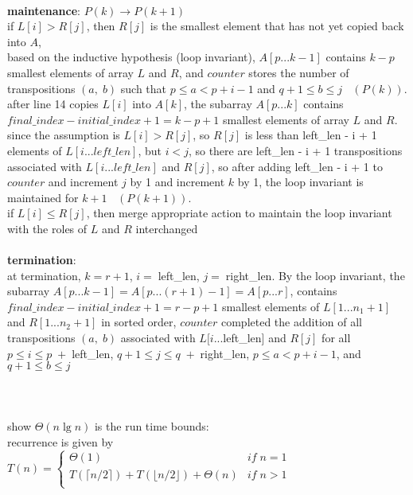 \documentclass[12pt,border=4pt,multi]{article}%
\begin{document}
\\
\textbf{maintenance}: $P(k) \rightarrow P(k + 1)$\\
if $L[i] > R[j]$, then $R[j]$ is the smallest element that has not yet copied back into $A$,\\
based on the inductive hypothesis (loop invariant), $A[p...k - 1]$ contains $k - p$ smallest elements of array $L$ and $R$, and $counter$ stores the number of transpositions $(a,\;b)$ such that $p \leq a < p + i - 1$ and $q + 1 \leq b \leq j$
$\;\;(P(k))$.\\
after line 14 copies $L[i]$ into $A[k]$, the subarray $A[p...k]$ contains $final\_index - initial\_index + 1 = k - p + 1$ smallest elements of array $L$ and $R$. since the assumption is $L[i] > R[j]$, so $R[j]$ is less than left\_len - i + 1 elements of $L[i...left\_len]$, but $i < j$, so there are left\_len - i + 1 transpositions associated with $L[i...left\_len]$ and $R[j]$, so after adding left\_len - i + 1 to $counter$ and increment $j$ by 1 and increment $k$ by 1, the loop invariant is maintained for $k + 1$ $\;\;(P(k + 1))$.\\
if $L[i] \leq R[j]$, then merge appropriate action to maintain the loop invariant with the roles of $L$ and $R$ interchanged\\
\\
\textbf{termination}:\\
at termination, $k = r + 1$, $i = \;$left\_len, $j = \;$right\_len. By the loop invariant, the subarray $A[p...k - 1] = A[p...(r + 1) - 1] = A[p...r]$, contains $final\_index - initial\_index + 1 = r - p + 1$ smallest elements of $L[1...n_1 + 1]$ and $R[1...n_2 + 1]$ in sorted order, $counter$ completed the addition of all transpositions $(a,\;b)$ associated with $L[i...$left\_len] and $R[j]$ for all $p \leq i \leq p \; + \;$left\_len, $q + 1 \leq j \leq q\; + \; $right\_len, $p \leq a < p + i - 1$, and $q + 1 \leq b \leq j$\\
\\
\\
\\
show $\Theta(n\lg n)$ is the run time bounds:\\
recurrence is given by\\
$T(n) =
\begin{cases}
    \Theta(1) & if\;n = 1\\
    T(\lceil n / 2 \rceil) + T(\lfloor n / 2 \rfloor) + \Theta(n) & if\;n > 1\\
\end{cases}
$\\
\end{document}
